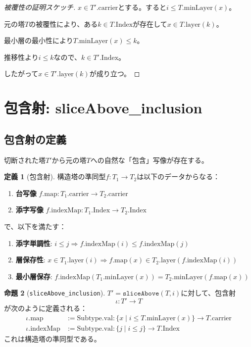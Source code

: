 \documentclass[a4paper,11pt]{article}
\theoremstyle{definition}
\newtheorem{definition}{定義}[section]
\newtheorem{proposition}[definition]{命題}
\begin{document}
\begin{proof}[被覆性の証明スケッチ]
$x \in T'.\text{carrier}$とする。すると$i \leq T.\text{minLayer}(x)$。

元の塔$T$の被覆性により、ある$k \in T.\text{Index}$が存在して$x \in T.\text{layer}(k)$。

最小層の最小性により$T.\text{minLayer}(x) \leq k$。

推移性より$i \leq k$なので、$k \in T'.\text{Index}$。

したがって$x \in T'.\text{layer}(k)$が成り立つ。
\end{proof}

\section{包含射: sliceAbove\_inclusion}

\subsection{包含射の定義}

切断された塔$T'$から元の塔$T$への自然な「包含」写像が存在する。

\begin{definition}[包含射]
構造塔の準同型$f : T_1 \to T_2$は以下のデータからなる：
\begin{enumerate}
    \item \textbf{台写像} $f.\text{map} : T_1.\text{carrier} \to T_2.\text{carrier}$
    \item \textbf{添字写像} $f.\text{indexMap} : T_1.\text{Index} \to T_2.\text{Index}$
\end{enumerate}
で、以下を満たす：
\begin{enumerate}
    \item \textbf{添字単調性}: $i \leq j \Rightarrow f.\text{indexMap}(i) \leq f.\text{indexMap}(j)$
    \item \textbf{層保存性}: $x \in T_1.\text{layer}(i) \Rightarrow f.\text{map}(x) \in T_2.\text{layer}(f.\text{indexMap}(i))$
    \item \textbf{最小層保存}: $f.\text{indexMap}(T_1.\text{minLayer}(x)) = T_2.\text{minLayer}(f.\text{map}(x))$
\end{enumerate}
\end{definition}

\begin{proposition}[\texttt{sliceAbove\_inclusion}]
$T' = \texttt{sliceAbove}(T, i)$に対して、包含射
\[
\iota : T' \to T
\]
が次のように定義される：
\begin{align*}
\iota.\text{map} &:= \text{Subtype.val} : \{x \mid i \leq T.\text{minLayer}(x)\} \to T.\text{carrier} \\
\iota.\text{indexMap} &:= \text{Subtype.val} : \{j \mid i \leq j\} \to T.\text{Index}
\end{align*}
これは構造塔の準同型である。
\end{proposition}
\end{document}
